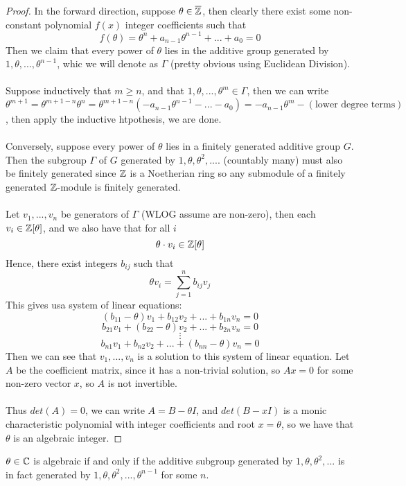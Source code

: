  \begin{proof}
 In the forward direction, suppose $\theta \in \overline{\mathbb{Z}}$, then clearly there exist some non-constant polynomial $f(x)$ integer coefficients such that
 \[f(\theta) = \theta^n + a_{n-1}\theta^{n-1} + ... + a_0 = 0\]
 Then we claim that every power of $\theta$ lies in the additive group generated by $1, \theta, ..., \theta^{n-1}$, whic we will denote as $\Gamma$ (pretty obvious using Euclidean Division).\\\\
 Suppose inductively that $m \geq n$, and that $1, \theta, ..., \theta^m \in \Gamma$, then we can write
 \[\theta^{m+1} = \theta^{m + 1 - n} \theta^n = \theta^{m + 1 - n}(-a_{n-1}\theta^{n-1} - ... - a_0) = -a_{n-1}\theta^m - (\text{lower degree terms})\]
 , then apply the inductive htpothesis, we are done.\\\\
 Conversely, suppose every power of $\theta$ lies in a finitely generated additive group $G$. Then the subgroup $\Gamma$ of $G$ generated by $1, \theta, \theta^2, ....$ (countably many) must also be finitely generated since $\mathbb{Z}$ is a Noetherian ring so any submodule of a finitely generated $\mathbb{Z}$-module is finitely generated.\\\\
 Let $v_1, ..., v_n$ be generators of $\Gamma$ (WLOG assume are non-zero), then each $v_i \in \mathbb{Z}[\theta]$, and we also have that for all $i$
 \[\theta \cdot v_i \in \mathbb{Z}[\theta]\]
 Hence, there exist integers $b_{ij}$ such that
 \[\theta v_i = \sum_{j = 1}^n b_{ij} v_j\]
 This gives usa system of linear equations:
 \[(b_{11} - \theta)v_1 + b_{12}v_2 + ... + b_{1n}v_n = 0\]
 \[b_{21}v_1 + (b_{22} - \theta)v_2 + ... + b_{2n}v_n = 0\]
 \[\vdots\]
 \[b_{n1}v_1 + b_{n2}v_2 + ... + (b_{nn} - \theta)v_n = 0\]
 Then we can see that $v_1, ..., v_n$ is a solution to this system of linear equation. Let $A$ be the coefficient matrix, since it has a non-trivial solution, so $Ax = 0$ for some non-zero vector $x$, so $A$ is not invertible.\\\\
 Thus $det(A) = 0$, we can write $A = B - \theta I$, and $det(B - xI)$ is a monic characteristic polynomial with integer coefficients and root $x = \theta$, so we have that $\theta$ is an algebraic integer. 
 \end{proof}
 
\begin{lemma}
$\theta \in \mathbb{C}$ is algebraic if and only if the additive subgroup generated by $1, \theta, \theta^2, ...$ is in fact generated by $1, \theta, \theta^2, ..., \theta^{n-1}$ for some $n$.
\end{lemma}

